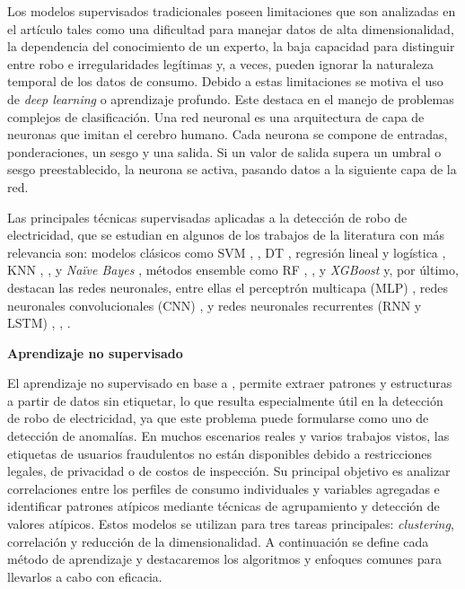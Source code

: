 \documentclass[12pt,a4paper]{report}
\begin{document}
Los modelos supervisados tradicionales poseen limitaciones que son analizadas en el artículo \cite{articulo1} tales como una dificultad para manejar datos de alta dimensionalidad, la dependencia del conocimiento de un experto, la baja capacidad para distinguir entre robo e irregularidades legítimas y, a veces, pueden ignorar la naturaleza temporal de los datos de consumo. Debido a estas limitaciones se motiva el uso de \emph{deep learning} o aprendizaje profundo. Este destaca en el manejo de problemas complejos de clasificación. Una red neuronal es una arquitectura de capa de neuronas que imitan el cerebro humano. Cada neurona se compone de entradas, ponderaciones, un sesgo y una salida. Si un valor de salida supera un umbral o sesgo preestablecido, la neurona se activa, pasando datos a la siguiente capa de la red.

Las principales técnicas supervisadas aplicadas a la detección de robo de electricidad, que se estudian en algunos de los trabajos de la literatura con más relevancia son: modelos clásicos como SVM \cite{articuloBase}, \cite{articulo5}, DT \cite{articuloBase}, regresión lineal y logística \cite{articuloBase}, KNN \cite{articulo1}, \cite{articuloBase}, \cite{articulo2} y \emph{Naïve Bayes} \cite{articulo1}, métodos ensemble como RF \cite{articuloBase}, \cite{articulo2}, \cite{articulo3} y \emph{XGBoost} \cite{articulo3} y, por último, destacan las redes neuronales, entre ellas el perceptrón multicapa (MLP) \cite{articulo3}, redes neuronales convolucionales (CNN) \cite{articuloBase}, \cite{articulo3} y redes neuronales recurrentes (RNN y LSTM) \cite{articulo1}, \cite{articuloBase}, \cite{articulo3}.

\medskip

\textbf{Aprendizaje no supervisado}

El aprendizaje no supervisado en base a \cite{ML No Supervisado}, permite extraer patrones y estructuras a partir de datos sin etiquetar, lo que resulta especialmente útil en la detección de robo de electricidad, ya que este problema puede formularse como uno de detección de anomalías. En muchos escenarios reales y varios trabajos vistos, las etiquetas de usuarios fraudulentos no están disponibles debido a restricciones legales, de privacidad o de costos de inspección. Su principal objetivo es analizar correlaciones entre los perfiles de consumo individuales y variables agregadas e identificar patrones atípicos mediante técnicas de agrupamiento y detección de valores atípicos. Estos modelos se utilizan para tres tareas principales: \emph{clustering}, correlación y reducción de la dimensionalidad. A continuación se define cada método de aprendizaje y destacaremos los algoritmos y enfoques comunes para llevarlos a cabo con eficacia.
\end{document}
